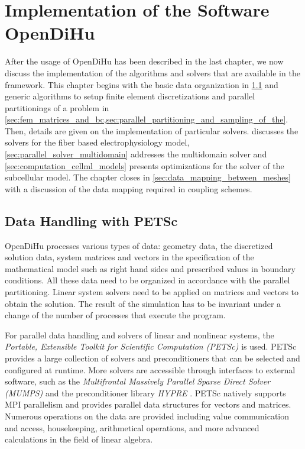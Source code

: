 \chapter{Implementation of the Software OpenDiHu}\label{sec:implementation}

After the usage of OpenDiHu has been described in the last chapter, we now discuss the implementation of the algorithms and solvers that are available in the framework. This chapter begins with the basic data organization in \cref{sec:data_handling_with_petsc} and generic algorithms to setup finite element discretizations and parallel partitionings of a problem in \cref{sec:fem_matrices_and_bc,sec:parallel_partitioning_and_sampling_of_the}. Then, details are given on the implementation of particular solvers.  discusses the solvers for the fiber based electrophysiology model, \cref{sec:parallel_solver_multidomain} addresses the multidomain solver and \cref{sec:computation_cellml_models} presents optimizations for the solver of the subcellular model. The chapter closes in \cref{sec:data_mapping_between_meshes} with a discussion of the data mapping required in coupling schemes.

\section{Data Handling with PETSc}\label{sec:data_handling_with_petsc}

OpenDiHu processes various types of data: geometry data, the discretized solution data, system matrices and vectors in the specification of the mathematical model such as right hand sides and prescribed values in boundary conditions.
All these data need to be organized in accordance with the parallel partitioning. Linear system solvers need to be applied on matrices and vectors to obtain the solution.
The result of the simulation has to be invariant under a change of the number of processes that execute the program.

For parallel data handling and solvers of linear and nonlinear systems, the \emph{Portable, Extensible Toolkit for Scientific Computation (PETSc)} \cite{petsc-web-page,petsc-user-ref,petsc-efficient1997} is used. PETSc provides a large collection of solvers and preconditioners that can be selected and configured at runtime. More solvers are accessible through interfaces to external software, such as the \emph{Multifrontal Massively Parallel Sparse Direct Solver (MUMPS)} \cite{mumps2001,mumps2019} and the preconditioner library \emph{HYPRE} \cite{falgout2002hypre}. PETSc natively supports MPI parallelism and provides parallel data structures for vectors and matrices. Numerous operations on the data are provided including value communication and access, housekeeping, arithmetical operations, and more advanced calculations in the field of linear algebra.

